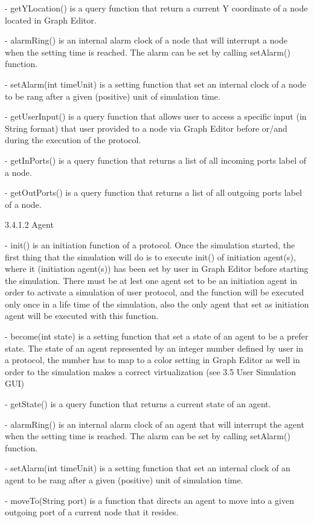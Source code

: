 \begin{description}
\begin{description}
\begin{description}
\begin{description}
- getYLocation() is a query function that return a current Y coordinate of a node located in Graph Editor.

- alarmRing() is an internal alarm clock of a node that will interrupt a node when the setting time is reached. The alarm can be set by calling setAlarm() function.

- setAlarm(int timeUnit) is a setting function that set an internal clock of a node to be rang after a given (positive) unit of simulation time.

- getUserInput() is a query function that allows user to access a specific input (in String format) that user provided to a node via Graph Editor before or/and during the execution of the protocol.

- getInPorts() is a query function that returns a list of all incoming ports label of a node.

- getOutPorts() is a query function that returns a list of all outgoing ports label of a node.


3.4.1.2 Agent

- init() is an initiation function of a protocol. Once the simulation started, the first thing that the simulation will do is to execute init() of initiation agent(s), where it (initiation agent(s)) has been set by user in Graph Editor before starting the simulation. There must be at lest one agent set to be an initiation agent in order to activate a simulation of user protocol, and the function will be executed only once in a life time of the simulation, also the only agent that set as initiation agent will be executed with this function.


- become(int state) is a setting function that set a state of an agent to be a prefer state. The state of an agent represented by an integer number defined by user in a protocol, the number has to map to a color setting in Graph Editor as well in order to the simulation makes a correct virtualization (see 3.5 User Simulation GUI)

- getState() is a query function that returns a current state of an agent.

- alarmRing() is an internal alarm clock of an agent that will interrupt the agent when the setting time is reached. The alarm can be set by calling setAlarm() function.

- setAlarm(int timeUnit) is a setting function that set an internal clock of an agent to be rang after a given (positive) unit of simulation time.

- moveTo(String port) is a function that directs an agent to move into a given outgoing port of a current node that it resides.


\end{description}
\end{description}
\end{description}
\end{description}
